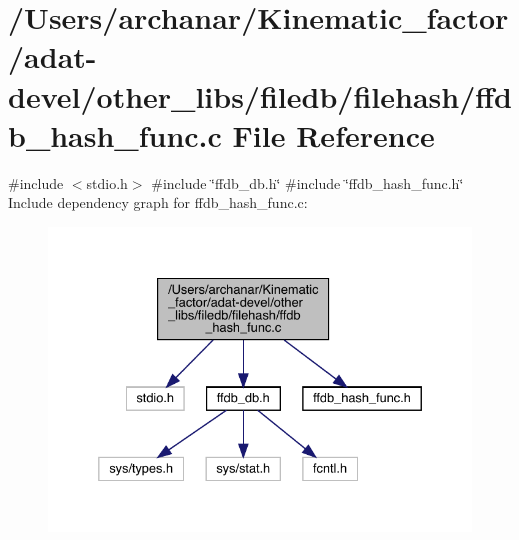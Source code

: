 \hypertarget{adat-devel_2other__libs_2filedb_2filehash_2ffdb__hash__func_8c}{}\section{/\+Users/archanar/\+Kinematic\+\_\+factor/adat-\/devel/other\+\_\+libs/filedb/filehash/ffdb\+\_\+hash\+\_\+func.c File Reference}
\label{adat-devel_2other__libs_2filedb_2filehash_2ffdb__hash__func_8c}
{\ttfamily \#include $<$stdio.\+h$>$}\newline
{\ttfamily \#include \char`\"{}ffdb\+\_\+db.\+h\char`\"{}}\newline
{\ttfamily \#include \char`\"{}ffdb\+\_\+hash\+\_\+func.\+h\char`\"{}}\newline
Include dependency graph for ffdb\+\_\+hash\+\_\+func.\+c\+:
\nopagebreak
\begin{figure}[H]
\begin{center}
\leavevmode
\includegraphics[width=332pt]{d4/de2/adat-devel_2other__libs_2filedb_2filehash_2ffdb__hash__func_8c__incl}
\end{center}
\end{figure}
